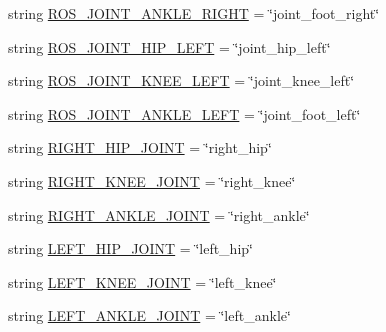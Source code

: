 \begin{DoxyCompactItemize}
\item 
string \mbox{\hyperlink{namespacepedal__simulation__interpolation__lennard_a1682632b545036588f264608a2096746}{R\+O\+S\+\_\+\+J\+O\+I\+N\+T\+\_\+\+A\+N\+K\+L\+E\+\_\+\+R\+I\+G\+HT}} = \char`\"{}joint\+\_\+foot\+\_\+right\char`\"{}
\item 
string \mbox{\hyperlink{namespacepedal__simulation__interpolation__lennard_ad084f33fcefc58fe5c8f9026a8403b18}{R\+O\+S\+\_\+\+J\+O\+I\+N\+T\+\_\+\+H\+I\+P\+\_\+\+L\+E\+FT}} = \char`\"{}joint\+\_\+hip\+\_\+left\char`\"{}
\item 
string \mbox{\hyperlink{namespacepedal__simulation__interpolation__lennard_a0cfb07b033ea7726a798437727a4a978}{R\+O\+S\+\_\+\+J\+O\+I\+N\+T\+\_\+\+K\+N\+E\+E\+\_\+\+L\+E\+FT}} = \char`\"{}joint\+\_\+knee\+\_\+left\char`\"{}
\item 
string \mbox{\hyperlink{namespacepedal__simulation__interpolation__lennard_af90827b5f81bd104e111119d48d2f051}{R\+O\+S\+\_\+\+J\+O\+I\+N\+T\+\_\+\+A\+N\+K\+L\+E\+\_\+\+L\+E\+FT}} = \char`\"{}joint\+\_\+foot\+\_\+left\char`\"{}
\item 
string \mbox{\hyperlink{namespacepedal__simulation__interpolation__lennard_a48d0ba7804889a380785e411a367252e}{R\+I\+G\+H\+T\+\_\+\+H\+I\+P\+\_\+\+J\+O\+I\+NT}} = \char`\"{}right\+\_\+hip\char`\"{}
\item 
string \mbox{\hyperlink{namespacepedal__simulation__interpolation__lennard_a531338da60c4f9bd9c4d954908a77637}{R\+I\+G\+H\+T\+\_\+\+K\+N\+E\+E\+\_\+\+J\+O\+I\+NT}} = \char`\"{}right\+\_\+knee\char`\"{}
\item 
string \mbox{\hyperlink{namespacepedal__simulation__interpolation__lennard_a34370649f429614dc22e36e2ae8a4a99}{R\+I\+G\+H\+T\+\_\+\+A\+N\+K\+L\+E\+\_\+\+J\+O\+I\+NT}} = \char`\"{}right\+\_\+ankle\char`\"{}
\item 
string \mbox{\hyperlink{namespacepedal__simulation__interpolation__lennard_a5c32ddd1464d58341cf7411ffb5ae18a}{L\+E\+F\+T\+\_\+\+H\+I\+P\+\_\+\+J\+O\+I\+NT}} = \char`\"{}left\+\_\+hip\char`\"{}
\item 
string \mbox{\hyperlink{namespacepedal__simulation__interpolation__lennard_a42b7c80b5ded0f2bbdf8b48ed1b99804}{L\+E\+F\+T\+\_\+\+K\+N\+E\+E\+\_\+\+J\+O\+I\+NT}} = \char`\"{}left\+\_\+knee\char`\"{}
\item 
string \mbox{\hyperlink{namespacepedal__simulation__interpolation__lennard_a6434786403a40ce205b3136e5d7f72cf}{L\+E\+F\+T\+\_\+\+A\+N\+K\+L\+E\+\_\+\+J\+O\+I\+NT}} = \char`\"{}left\+\_\+ankle\char`\"{}
\item 

\end{DoxyCompactItemize}
